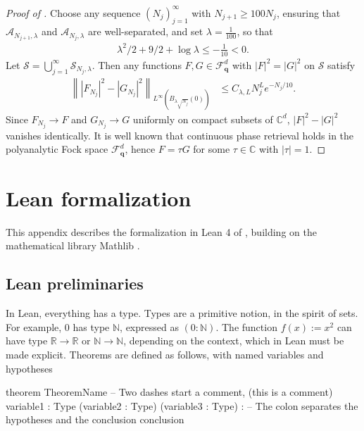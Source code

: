 \documentclass[11pt]{amsart}
\begin{document}
\begin{proof}[Proof of ]
    Choose any sequence $(N_j)_{j=1}^\infty$ with $N_{j+1} \geq 100 N_{j}$, ensuring that $\mathcal A_{N_{j+1},\lambda}$ and $\mathcal A_{N_{j},\lambda}$ are well-separated, and set $\lambda = \frac{1}{100}$, so that
    \begin{align*}
        \lambda^2/2 + 9/2 + \log \lambda \leq -\frac1{10} < 0.
    \end{align*}
    Let $\mathcal S = \bigcup_{j=1}^\infty \mathcal S_{N_j,\lambda}$. Then any functions $F,G \in \mathcal F^d_{\mathbf q}$ with $|F|^2 = |G|^2$ on $\mathcal S$ satisfy 
    \begin{align*}
        \left\lVert |F_{N_j}|^2-|G_{N_j}|^2 \right 
        \rVert_{L^\infty(B_{\lambda \sqrt{N_j}}(0))} &\leq C_{\lambda,L} N_j^{L} e^{- N_j/10}.
    \end{align*}
    Since $F_{N_j} \to F$ and $G_{N_j} \to G$ uniformly on compact subsets of $\mathbb C^d$, $|F|^2 - |G|^2$ vanishes identically. It is well known that continuous phase retrieval holds in the polyanalytic Fock space $\mathcal F^d_{\mathbf q}$, hence $F = \tau G$ for some $\tau \in \mathbb C$ with $|\tau| = 1$.
\end{proof}

\section{Lean formalization}

This appendix describes the formalization in Lean 4 \cite{MouraUllrich2021} of , building on the mathematical library Mathlib \cite{mathlib2020}.

\subsection{Lean preliminaries}


In Lean, everything has a type. Types are a primitive notion, in the spirit of sets. For example, $0$ has type $\mathbb N$, expressed as $(0:\mathbb N)$. The function $f(x) := x^2$ can have type $\mathbb R \to \mathbb R$ or $\mathbb N\to \mathbb N$, depending on the context, which in Lean must be made explicit. 
Theorems are defined as follows, with named variables and hypotheses
\begin{leancode}
theorem TheoremName -- Two dashes start a comment, (this is a comment)
    {variable1 : Type} (variable2 : Type) (variable3 : Type) : 
    -- The colon separates the hypotheses and the conclusion
    conclusion
\end{leancode}
\end{document}
